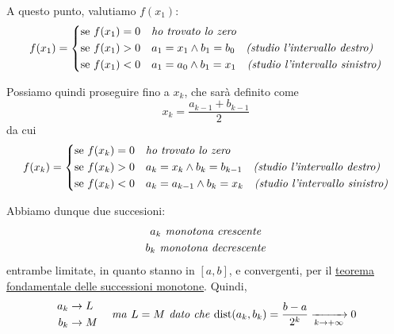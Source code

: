 \documentclass[../../analisi1]{subfiles}
\begin{document}
            A questo punto, valutiamo \(f(x_1)\):
            \[
                f(x_1) =
                \left\{
                \begin{aligned}
                    &\text{se } f(x_1) = 0 && \text{\emph{ho trovato lo zero}}\\
                    &\text{se } f(x_1) > 0 && a_1 = x_1 \land b_1 = b_0 \quad \text{\emph{(studio l'intervallo destro)}}\\
                    &\text{se } f(x_1) < 0 && a_1 = a_0 \land b_1 = x_1 \quad \text{\emph{(studio l'intervallo sinistro)}}
                \end{aligned}
                \right.
            \]

            Possiamo quindi proseguire fino a \(x_k\), che sarà definito come
            \[
                x_k = \frac{a_{k - 1} + b_{k - 1}}{2}
            \]
            da cui
            \[
                f(x_k) =
                \left\{
                \begin{aligned}
                    &\text{se } f(x_k) = 0 && \text{\emph{ho trovato lo zero}}\\
                    &\text{se } f(x_k) > 0 && a_k = x_k \land b_k = b_{k - 1} \quad \text{\emph{(studio l'intervallo destro)}}\\
                    &\text{se } f(x_k) < 0 && a_k = a_{k - 1} \land b_k = x_k \quad \text{\emph{(studio l'intervallo sinistro)}}
                \end{aligned}
                \right.
            \]

            Abbiamo dunque due succesioni:
            \begin{gather*}
                a_k \text{\emph{ monotona crescente}}\\
                b_k \text{\emph{ monotona decrescente}}
            \end{gather*}
            entrambe limitate, in quanto stanno in \([a, b]\), e convergenti, per il \hyperref[teoFondSuccMono]{teorema fondamentale
            delle successioni monotone}.
            Quindi,
            \[
                \left.
                \begin{aligned}
                    a_k &\to L\\
                    b_k &\to M
                \end{aligned}
                \right.
                \quad \text{\emph{ma }} L = M \text{\emph{ dato che }} \mathrm{dist}(a_k, b_k) = \frac{b - a}{2^k} \xrightarrow[k \to +\infty]{} 0
            \]
\end{document}
